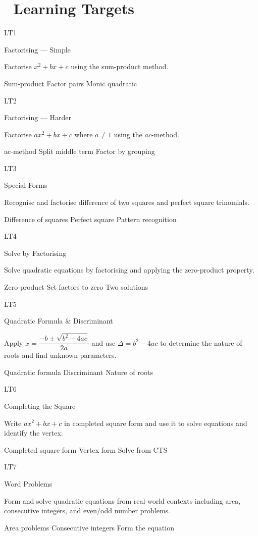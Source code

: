 \documentclass[
  letterpaper,
  DIV=11,
  numbers=noendperiod]{scrreprt}
\theoremstyle{definition}
\theoremstyle{remark}
\begin{document}
\section{🎯 Learning Targets}\label{learning-targets-5}

LT1

Factorising --- Simple

Factorise \(x^2 + bx + c\) using the sum-product method.

{Sum-product} {Factor pairs} {Monic quadratic}

LT2

Factorising --- Harder

Factorise \(ax^2 + bx + c\) where \(a \neq 1\) using the \(ac\)-method.

{ac-method} {Split middle term} {Factor by grouping}

LT3

Special Forms

Recognise and factorise difference of two squares and perfect square
trinomials.

{Difference of squares} {Perfect square} {Pattern recognition}

LT4

Solve by Factorising

Solve quadratic equations by factorising and applying the zero-product
property.

{Zero-product} {Set factors to zero} {Two solutions}

LT5

Quadratic Formula \& Discriminant

Apply \(x = \dfrac{-b \pm \sqrt{b^2-4ac}}{2a}\) and use
\(\Delta = b^2 - 4ac\) to determine the nature of roots and find unknown
parameters.

{Quadratic formula} {Discriminant} {Nature of roots}

LT6

Completing the Square

Write \(ax^2 + bx + c\) in completed square form and use it to solve
equations and identify the vertex.

{Completed square form} {Vertex form} {Solve from CTS}

LT7

Word Problems

Form and solve quadratic equations from real-world contexts including
area, consecutive integers, and even/odd number problems.

{Area problems} {Consecutive integers} {Form the equation}
\end{document}
